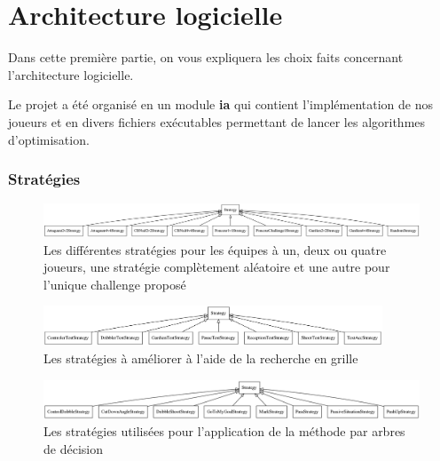 \documentclass[12pt,a4paper]{article}
\begin{document}
\newpage

\part{Architecture logicielle} %
Dans cette premi\`ere partie, on vous expliquera les choix faits 
concernant l'architecture logicielle.

Le projet a \'et\'e organis\'e en un module {\bfseries ia} qui contient 
l'impl\'ementation de nos joueurs et en divers fichiers ex\'ecutables 
permettant de lancer les algorithmes d'optimisation.

\section*{Strat\'egies}
\begin{figure}[!h]
  \centering
  \captionsetup{justification=centering}
  \includegraphics[width=1.\textwidth]{baseStrategies}
  \caption[Les strat\'egies de base]{Les diff\'erentes strat\'egies pour les 
\'equipes \`a un, deux ou quatre joueurs, une strat\'egie compl\`etement 
al\'eatoire et une autre pour l'unique challenge propos\'e}
  \label{fig:strats}
\end{figure}

\begin{figure}[!h]
  \centering
  \captionsetup{justification=centering}
  \includegraphics[width=0.9\textwidth]{gridSearch}
  \caption[Les strat\'egies pour la recherche en grille]{Les strat\'egies \`a 
am\'eliorer \`a l'aide de la recherche en grille}
  \label{fig:gs}
\end{figure}

\begin{figure}[!h]
  \centering
  \captionsetup{justification=centering}
  \includegraphics[width=1.\textwidth]{decisionTree}
  \caption[Les strat\'egies pour l'arbre de d\'ecision]{Les strat\'egies 
utilis\'ees pour l'application de la m\'ethode par arbres de d\'ecision}
  \label{fig:dt}
\end{figure}
\end{document}
